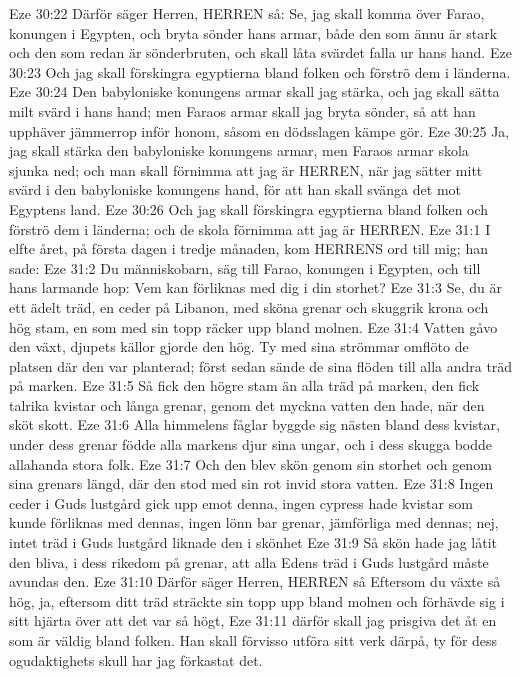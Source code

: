 Eze 30:22  Därför säger Herren, HERREN så: Se, jag skall komma över Farao, konungen i Egypten, och bryta sönder hans armar, både den som ännu är stark och den som redan är sönderbruten, och skall låta svärdet falla ur hans hand.
Eze 30:23  Och jag skall förskingra egyptierna bland folken och förströ dem i länderna.
Eze 30:24  Den babyloniske konungens armar skall jag stärka, och jag skall sätta milt svärd i hans hand; men Faraos armar skall jag bryta sönder, så att han upphäver jämmerrop inför honom, såsom en dödsslagen kämpe gör.
Eze 30:25  Ja, jag skall stärka den babyloniske konungens armar, men Faraos armar skola sjunka ned; och man skall förnimma att jag är HERREN, när jag sätter mitt svärd i den babyloniske konungens hand, för att han skall svänga det mot Egyptens land.
Eze 30:26  Och jag skall förskingra egyptierna bland folken och förströ dem i länderna; och de skola förnimma att jag är HERREN.
Eze 31:1  I elfte året, på första dagen i tredje månaden, kom HERRENS ord till mig; han sade:
Eze 31:2  Du människobarn, säg till Farao, konungen i Egypten, och till hans larmande hop: Vem kan förliknas med dig i din storhet?
Eze 31:3  Se, du är ett ädelt träd, en ceder på Libanon, med sköna grenar och skuggrik krona och hög stam, en som med sin topp räcker upp bland molnen.
Eze 31:4  Vatten gåvo den växt, djupets källor gjorde den hög. Ty med sina strömmar omflöto de platsen där den var planterad; först sedan sände de sina flöden till alla andra träd på marken.
Eze 31:5  Så fick den högre stam än alla träd på marken, den fick talrika kvistar och långa grenar, genom det myckna vatten den hade, när den sköt skott.
Eze 31:6  Alla himmelens fåglar byggde sig nästen bland dess kvistar, under dess grenar födde alla markens djur sina ungar, och i dess skugga bodde allahanda stora folk.
Eze 31:7  Och den blev skön genom sin storhet och genom sina grenars längd, där den stod med sin rot invid stora vatten.
Eze 31:8  Ingen ceder i Guds lustgård gick upp emot denna, ingen cypress hade kvistar som kunde förliknas med dennas, ingen lönn bar grenar, jämförliga med dennas; nej, intet träd i Guds lustgård liknade den i skönhet
Eze 31:9  Så skön hade jag låtit den bliva, i dess rikedom på grenar, att alla Edens träd i Guds lustgård måste avundas den.
Eze 31:10  Därför säger Herren, HERREN så Eftersom du växte så hög, ja, eftersom ditt träd sträckte sin topp upp bland molnen och förhävde sig i sitt hjärta över att det var så högt,
Eze 31:11  därför skall jag prisgiva det åt en som är väldig bland folken. Han skall förvisso utföra sitt verk därpå, ty för dess ogudaktighets skull har jag förkastat det.
